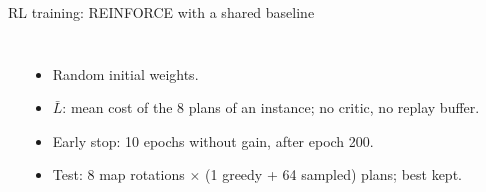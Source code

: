 \documentclass[aspectratio=169,11pt,t]{beamer}
\begin{document}
\begin{frame}{RL training: REINFORCE with a shared baseline}
\begin{columns}[T]
\begin{algorithm}[H]
\caption{RL Training}
\end{algorithm}
\small
\begin{itemize}
  \item Random initial weights.
  \item $\bar L$: mean cost of the 8 plans of an instance; no critic, no replay buffer.
  \item Early stop: 10 epochs without gain, after epoch 200.
  \item Test: 8 map rotations $\times$ (1 greedy + 64 sampled) plans; best kept.
\end{itemize}
\end{columns}
\end{frame}
\end{document}
